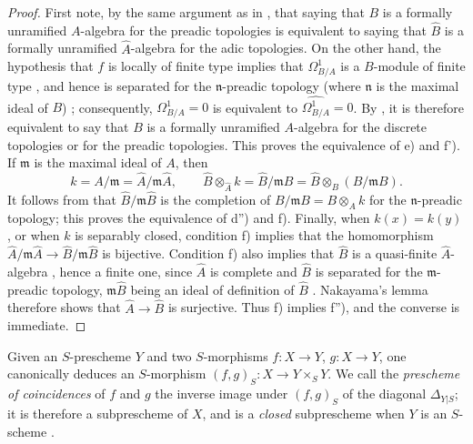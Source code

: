 \begin{proof}
First note, by the same argument as in , that saying that $B$ is a formally unramified $A$-algebra for the preadic topologies is equivalent to saying that $\widehat{B}$ is a formally unramified $\widehat{A}$-algebra for the adic topologies.
On the other hand, the hypothesis that $f$ is locally of finite type implies that
$\Omega^1_{B/A}$ is a $B$-module of finite type , and hence is separated for the $\mathfrak{n}$-preadic topology (where $\mathfrak{n}$ is the maximal ideal of $B$) ; consequently, $\Omega^1_{B/A}=0$ is equivalent to $\widehat{\Omega^1_{B/A}}=0$. By , it is therefore equivalent to say that $B$ is a formally unramified $A$-algebra for the discrete topologies or for the preadic topologies. This proves the equivalence of e) and f').
If $\mathfrak{m}$ is the maximal ideal of $A$, then
\[
k=A/\mathfrak{m}=\widehat{A}/\mathfrak{m}\widehat{A},\qquad
\widehat{B}\otimes_{\widehat{A}}k=\widehat{B}/\mathfrak{m}\widehat{B}
=\widehat{B}\otimes_B(B/\mathfrak{m}B).
\]
It follows from  that $\widehat{B}/\mathfrak{m}\widehat{B}$ is the completion of $B/\mathfrak{m}B=B\otimes_A k$ for the $\mathfrak{n}$-preadic topology; this proves the equivalence of d'') and f).
Finally, when $k(x)=k(y)$, or when $k$ is separably closed, condition f) implies that the homomorphism $\widehat{A}/\mathfrak{m}\widehat{A}\to\widehat{B}/\mathfrak{m}\widehat{B}$ is bijective. Condition f) also implies that $\widehat{B}$ is a quasi-finite $\widehat{A}$-algebra , hence a finite one, since $\widehat{A}$ is complete and $\widehat{B}$ is separated for the $\mathfrak{m}$-preadic topology, $\mathfrak{m}\widehat{B}$ being an ideal of definition of $\widehat{B}$ . Nakayama's lemma therefore shows that $\widehat{A}\to\widehat{B}$ is surjective. Thus f) implies f''), and the converse is immediate.
\end{proof}

\begin{env}[17.4.5]
\label{IV.17.4.5}
Given an $S$-prescheme $Y$ and two $S$-morphisms $f:X\to Y$, $g:X\to Y$, one canonically deduces an $S$-morphism $(f,g)_S:X\to Y\times_S Y$.
We call the \emph{prescheme of coincidences} of $f$ and $g$ the inverse image under $(f,g)_S$ of the diagonal $\Delta_{Y|S}$; it is therefore a subprescheme of $X$, and is a \emph{closed} subprescheme when $Y$ is an $S$-scheme .
\end{env}

